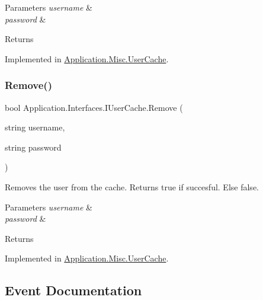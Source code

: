 \begin{DoxyParams}{Parameters}
{\em username} & \\
\hline
{\em password} & \\
\hline
\end{DoxyParams}
\begin{DoxyReturn}{Returns}

\end{DoxyReturn}


Implemented in \mbox{\hyperlink{class_application_1_1_misc_1_1_user_cache_ad11a0422af31b1492098415d8e4aaad8}{Application.\+Misc.\+User\+Cache}}.

\mbox{\label{interface_application_1_1_interfaces_1_1_i_user_cache_ac8ccbf20ac25069528e1e5117d5481ee}} 
\subsubsection{\texorpdfstring{Remove()}{Remove()}}
{\footnotesize\ttfamily bool Application.\+Interfaces.\+I\+User\+Cache.\+Remove (\begin{DoxyParamCaption}\item[{string}]{username,  }\item[{string}]{password }\end{DoxyParamCaption})}



Removes the user from the cache. Returns true if succesful. Else false. 


\begin{DoxyParams}{Parameters}
{\em username} & \\
\hline
{\em password} & \\
\hline
\end{DoxyParams}
\begin{DoxyReturn}{Returns}

\end{DoxyReturn}


Implemented in \mbox{\hyperlink{class_application_1_1_misc_1_1_user_cache_af685f56bf378e2bde07f7f6f933a8e0e}{Application.\+Misc.\+User\+Cache}}.



\subsection{Event Documentation}
\mbox{\label{interface_application_1_1_interfaces_1_1_i_user_cache_ae30035d1893d41c53cdd16627963a252}} 
